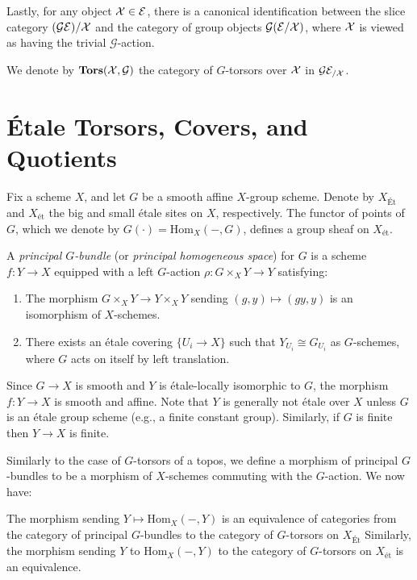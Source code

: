 Lastly, for any object $\mathcal{X} \in \mathcal{E}$, there is a canonical identification between the slice category
$(\mathcal{G}\mathcal{E})/\mathcal{X}$ and the category of group objects $\mathcal{G}(\mathcal{E}/\mathcal{X})$, where $\mathcal{X}$ is viewed as having the 
trivial $\mathcal{G}$-action.

We denote by $\mathbf{Tors}(\mathcal{X}, \mathcal{G})$ the category of $G$-torsors over $\mathcal{X}$ in $\mathcal{G} \mathcal{E}_{/\mathcal{X}}$.

\section{\'Etale Torsors, Covers, and Quotients}
Fix a scheme $X$, and let $G$ be a smooth affine $X$-group scheme. 
Denote by $X_{\text{Ét}}$ and $X_{\text{ét}}$ the big and small étale sites on $X$, respectively. 
The functor of points of $G$, which we denote by $G(\cdot) = \mathrm{Hom}_X(-, G)$, defines a group sheaf on 
$X_{\text{ét}}$.

\begin{definition} A \textit{principal $G$-bundle} (or \textit{principal homogeneous space}) for $G$ is a 
scheme $f : Y \to X$ equipped with a left $G$-action $\rho: G \times_X Y \to Y$ satisfying:
\begin{enumerate}
    \item The morphism $G \times_X Y \to Y \times_X Y$ sending $(g, y) \mapsto (gy, y)$ is an isomorphism of $X$-schemes.
    \item There exists an étale covering $\{U_i \to X\}$ such that $Y_{U_i} \cong G_{U_i}$ as $G$-schemes, 
    where $G$ acts on itself by left translation.
\end{enumerate}
\end{definition}

\begin{rem*}
    Since $G \to X$ is smooth and $Y$ is étale-locally isomorphic to $G$, 
    the morphism $f: Y \to X$ is smooth and affine. Note that $Y$ is generally not étale over $X$ unless $G$ is an 
    étale group scheme (e.g., a finite constant group).
    Similarly, if $G$ is finite then $Y \to X$ is finite.
\end{rem*}

Similarly to the case of $G$-torsors of a topos, we define a morphism of principal $G$-bundles to be a morphism of $X$-schemes commuting with the
$G$-action. We now have:

\begin{theorem}\label{theorem:torsors_are_realized_as_spaces}
    The morphism sending $Y \mapsto \mathrm{Hom}_X(-, Y)$ is an equivalence of categories from the category of principal $G$-bundles 
    to the category of $G$-torsors on $X_{\text{\'Et}}$
    Similarly, the morphism sending $Y$ to $\mathrm{Hom}_X(-, Y)$ to the category of $G$-torsors on $X_{\text{ét}}$ is an equivalence.
\end{theorem}

